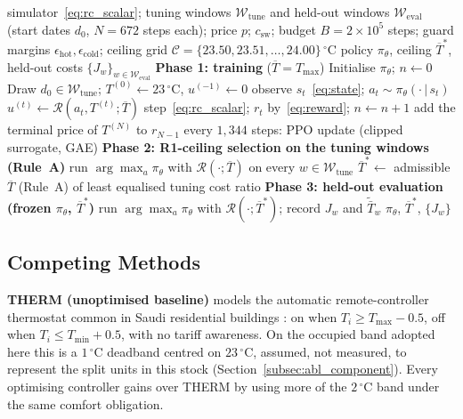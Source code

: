 \documentclass[pdflatex,sn-mathphys-num,iicol]{sn-jnl}
\theoremstyle{thmstyleone}\newtheorem{proposition}{Proposition}\newtheorem{corollary}{Corollary}
\theoremstyle{thmstyletwo}\newtheorem{remark}{Remark}\newtheorem{observation}{Observation}
\theoremstyle{thmstylethree}\newtheorem{definition}{Definition}
\newcommand{\Tmin}{T_{\min}}
\newcommand{\Tmax}{T_{\max}}
\newcommand{\csw}{c_{\mathrm{sw}}}
\begin{document}
\begin{algorithm}[!t]
\caption{RBRL: training, ceiling selection and evaluation}
\label{alg:rbrl}
\begin{algorithmic}[1]
\Require simulator~\eqref{eq:rc_scalar}; tuning windows $\mathcal{W}_{\mathrm{tune}}$
  and held-out windows $\mathcal{W}_{\mathrm{eval}}$ (start dates $d_0$, $N=672$
  steps each); price $p$; $\csw$; budget $B=2\times10^{5}$ steps; guard
  margins $\epsilon_{\mathrm{hot}},\epsilon_{\mathrm{cold}}$; ceiling grid
  $\mathcal{C}=\{23.50,23.51,\dots,24.00\}\,^\circ$C
\Ensure policy $\pi_\theta$, ceiling $\overline{T}^{*}$, held-out costs
  $\{J_w\}_{w\in\mathcal{W}_{\mathrm{eval}}}$
\Statex \textbf{Phase 1: training} ($\overline{T}=\Tmax$)
\State Initialise $\pi_\theta$; $n\leftarrow0$
 
  \State Draw $d_0\in\mathcal{W}_{\mathrm{tune}}$; $T^{(0)}\leftarrow23\,^\circ$C, $u^{(-1)}\leftarrow0$
    \State observe $s_t$~\eqref{eq:state}; $a_t\sim\pi_\theta(\cdot\,|\,s_t)$
    \State $u^{(t)}\leftarrow\mathcal{R}(a_t,T^{(t)};\overline{T})$ 
    \State step~\eqref{eq:rc_scalar}; $r_t$ by~\eqref{eq:reward}; $n\leftarrow n+1$
  \EndFor
  \State add the terminal price of $T^{(N)}$ to $r_{N-1}$
  \State every $1{,}344$ steps: PPO update (clipped surrogate, GAE)
\EndWhile
\Statex \textbf{Phase 2: R1-ceiling selection on the tuning windows (Rule~A)}
  \State run $\arg\max_a\pi_\theta$ with $\mathcal{R}(\cdot;\overline{T})$ on every $w\in\mathcal{W}_{\mathrm{tune}}$
\EndFor
\State $\overline{T}^{*}\leftarrow$ admissible $\overline{T}$ (Rule~A) of least
  equalised tuning cost ratio
\Statex \textbf{Phase 3: held-out evaluation (frozen $\pi_\theta$, $\overline{T}^{*}$)}
  \State run $\arg\max_a\pi_\theta$ with $\mathcal{R}(\cdot;\overline{T}^{*})$; record $J_w$ and $\tilde{\bar T}_w$
\EndFor
\State\Return $\pi_\theta$, $\overline{T}^{*}$, $\{J_w\}$ 
\end{algorithmic}
\end{algorithm}
 
\subsection{Competing Methods}
\label{subsec:compete}
 
\textbf{THERM (unoptimised baseline)} models the automatic remote-controller thermostat common in Saudi residential buildings \citep{Alotaibi2024}: on when $T_i\ge\Tmax-0.5$, off when $T_i\le\Tmin+0.5$, with no tariff awareness. On the occupied band adopted here this is a $1\,^\circ$C deadband centred on $23\,^\circ$C, assumed, not measured, to represent the split units in this stock (Section~\ref{subsec:abl_component}). Every optimising controller gains over THERM by using more of the $2\,^\circ$C band under the same comfort obligation.
\end{document}
